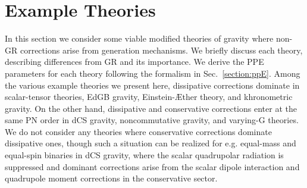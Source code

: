\documentclass[prd,twocolumn,nofootinbib]{revtex4-1}
\begin{document}
 \section{Example Theories}
In this section we consider some viable modified theories of gravity where non-GR corrections arise from generation mechanisms. We briefly discuss each theory, describing differences from GR and its importance. We derive the PPE parameters for each theory following the formalism in Sec.~\ref{section:ppE}. Among the various example theories we present here, dissipative corrections dominate in scalar-tensor theories, EdGB gravity, Einstein-\AE ther theory, and khronometric gravity. On the other hand, dissipative and conservative corrections enter at the same PN order in dCS gravity, noncommutative gravity, and varying-G theories. We do not consider any theories where conservative corrections dominate dissipative ones, though such a situation can be realized for e.g. equal-mass and equal-spin binaries in dCS gravity, where the scalar quadrupolar radiation is suppressed and dominant corrections arise from the scalar dipole interaction and quadrupole moment corrections in the conservative sector.
\end{document}
